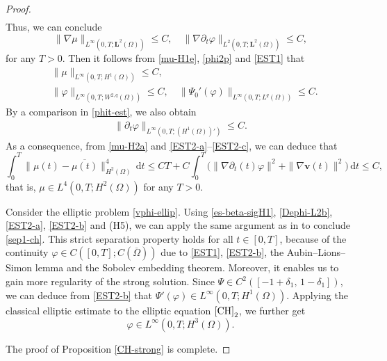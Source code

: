 \documentclass[11pt,reqno]{amsart}
\begin{document}
\begin{proof}
\begin{align}
\label{E2-alpha}
\end{align}
%
Thus, we can conclude
%
\begin{equation}
\label{EST1}
\| \nabla \mu\|_{L^\infty(0,T; \bm{L}^2(\Omega))} \leq C,
\quad
\| \nabla \partial_t \varphi\|_{L^2(0,T;\bm{L}^2(\Omega))}\leq C,
\end{equation}
%
for any $T>0$. Then it follows from \eqref{mu-H1e}, \eqref{phi2p} and \eqref{EST1}  that
%
\begin{align}
& \|  \mu\|_{L^\infty(0,T; H^1(\Omega))} \leq C,
 \label{EST2-a}\\
& \| \varphi\|_{L^\infty(0,T; W^{2,q}(\Omega))}\leq C,
\quad
\|\Psi_0'(\varphi)\|_{L^\infty(0,T;L^q(\Omega))} \leq C.
\label{EST2-b}
\end{align}
%
By a comparison in \eqref{phit-est}, we also obtain
\begin{align}
\|\partial_t \varphi\|_{L^\infty(0,T; (H^1(\Omega))')}\leq C.
\label{EST2-c}
\end{align}
%
As a consequence, from \eqref{mu-H2a} and \eqref{EST2-a}--\eqref{EST2-c}, we can deduce that
$$
\int_0^T \|\mu(t)-\overline{\mu(t)}\|_{H^2(\Omega)}^4\,\mathrm{d}t
\leq CT+ C \int_0^T\big(\|\nabla \partial_t(t)\varphi\|^2 + \|\nabla \bm{v}(t)\|^2\big)\,\mathrm{d}t\leq C,
$$
that is, $\mu\in L^4(0,T;H^2(\Omega))$ for any $T>0$.

Consider the elliptic problem \eqref{vphi-ellip}. Using \eqref{es-beta-sigH1}, \eqref{Dephi-L2b}, \eqref{EST2-a}, \eqref{EST2-b} and (H5), we can apply the same argument as in \cite[Section 3]{GGG2023} to conclude \eqref{sep1-ch}.
This strict separation property holds for all $t\in [0,T]$, because of the continuity $\varphi\in C([0,T]; C(\overline{\Omega}))$ due to \eqref{EST1}, \eqref{EST2-b}, the Aubin--Lions--Simon lemma and the Sobolev embedding theorem.
Moreover, it enables us to gain more regularity of the strong solution. Since $\Psi\in C^2([-1+\delta_1,\, 1-\delta_1])$, we can deduce from \eqref{EST2-b} that $\Psi' (\varphi )\in L^\infty (0 ,T ;H^1(\Omega ))$. Applying the classical elliptic estimate to the elliptic equation $\eqref{CH}_2$, we further get
%
\begin{equation}
	\varphi \in L^\infty (0 ,T ;H^3 (\Omega )).
	\label{phih3}
\end{equation}

The proof of Proposition \ref{CH-strong} is complete.
\end{proof}
\end{document}
